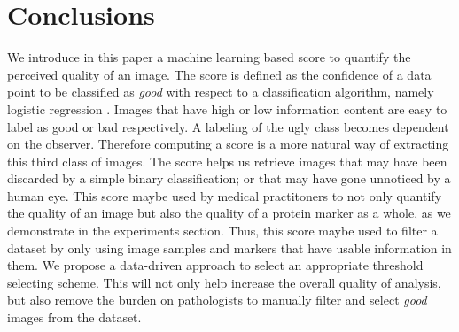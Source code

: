 \section{Conclusions}
We introduce in this paper a machine learning based score to quantify the perceived quality of an image.  The score is defined as the confidence of a data point to be classified as \textit{good} with respect to a classification algorithm, namely logistic regression . Images that have high or low information content are easy to label as good or bad respectively. A labeling of the ugly class becomes dependent on the observer. Therefore computing a score is a more natural way of extracting this third class of images. The score helps us retrieve images that may have been discarded by a simple binary classification; or that may have gone unnoticed by a human eye. This score maybe used by medical practitoners to not only quantify the quality of an image but also the quality of a protein marker as a whole, as we demonstrate in the experiments section. Thus, this score maybe used to filter a dataset by only using image samples and markers that have usable information in them. We propose a data-driven approach to select an appropriate threshold selecting scheme. This will not only help increase the overall quality of analysis, but also remove the burden on pathologists to manually filter and select \textit{good} images from the dataset.
